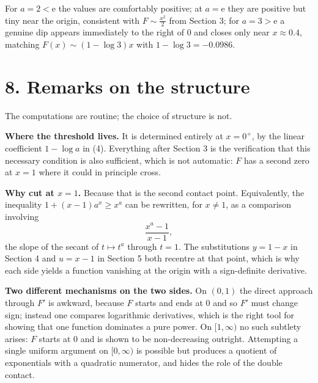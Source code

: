 \documentclass[12pt]{article}
\newcommand{\e}{\mathrm{e}}
\begin{document}
For \(a=2<\e\) the values are comfortably positive; at \(a=\e\) they are
positive but tiny near the origin, consistent with \(F\sim\frac{x^2}{2}\)
from Section 3; for \(a=3>\e\) a genuine dip appears immediately to the
right of \(0\) and closes only near \(x\approx0.4\), matching
\(F(x)\sim(1-\log3)x\) with \(1-\log3=-0.0986\).

\section*{8. Remarks on the structure}

The computations are routine; the choice of structure is not.

\textbf{Where the threshold lives.} It is determined entirely at
\(x=0^+\), by the linear coefficient \(1-\log a\) in (4). Everything
after Section 3 is the verification that this necessary condition is also
sufficient, which is not automatic: \(F\) has a second zero at
\(x=1\) where it could in principle cross.

\textbf{Why cut at \(x=1\).} Because that is the second contact point.
Equivalently, the inequality \(1+(x-1)a^x\ge x^a\) can be rewritten, for
\(x\ne1\), as a comparison involving
\[
\frac{x^a-1}{x-1},
\]
the slope of the secant of \(t\mapsto t^a\) through \(t=1\). The
substitutions \(y=1-x\) in Section 4 and \(u=x-1\) in Section 5 both
recentre at that point, which is why each side yields a function
vanishing at the origin with a sign-definite derivative.

\textbf{Two different mechanisms on the two sides.} On \((0,1)\) the
direct approach through \(F'\) is awkward, because \(F\) starts and ends
at \(0\) and so \(F'\) must change sign; instead one compares logarithmic
derivatives, which is the right tool for showing that one function
dominates a pure power. On \([1,\infty)\) no such subtlety arises: \(F\)
starts at \(0\) and is shown to be non-decreasing outright. Attempting a
single uniform argument on \([0,\infty)\) is possible but produces a
quotient of exponentials with a quadratic numerator, and hides the role
of the double contact.
\end{document}
